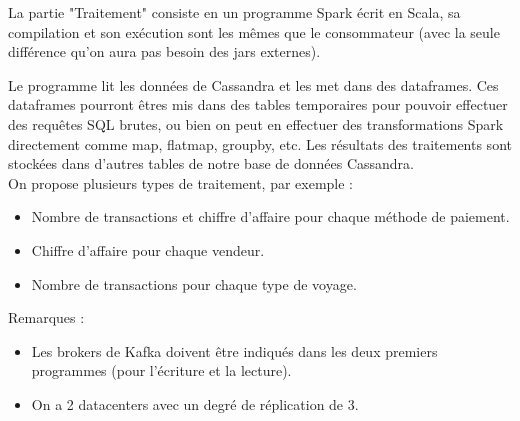 \documentclass[a4paper, 11pt, titlepage]{article}
\begin{document}
La partie "Traitement" consiste en un programme Spark écrit en Scala, sa compilation et son exécution sont les mêmes que le consommateur (avec la seule différence qu'on aura pas besoin des jars externes).

Le programme lit les données de Cassandra et les met dans des dataframes. Ces dataframes pourront êtres mis dans des tables temporaires pour pouvoir effectuer des requêtes SQL brutes, ou bien on peut en effectuer des transformations Spark directement comme map, flatmap, groupby, etc.
Les résultats des traitements sont stockées dans d'autres tables de notre base de données Cassandra.\\


On propose plusieurs types de traitement, par exemple :

\begin{itemize}
\item
Nombre de transactions et chiffre d'affaire pour chaque méthode de paiement.
\item
Chiffre d'affaire pour chaque vendeur.
\item
Nombre de transactions pour chaque type de voyage.\\
\end{itemize}


Remarques :

\begin{itemize}

\item
Les brokers de Kafka doivent être indiqués dans les deux premiers programmes (pour l'écriture et la lecture).

\item
On a 2 datacenters avec un degré de réplication de 3.
 
\end{itemize}
\end{document}
